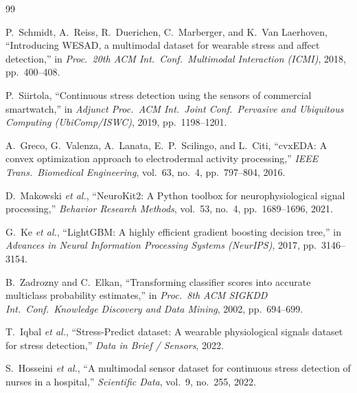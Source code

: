 \documentclass[11pt,a4paper]{article}
\begin{document}
\begin{thebibliography}{99}
\footnotesize

P.~Schmidt, A.~Reiss, R.~Duerichen, C.~Marberger, and K.~Van Laerhoven,
``Introducing WESAD, a multimodal dataset for wearable stress and affect detection,''
in \emph{Proc.\ 20th ACM Int.\ Conf.\ Multimodal Interaction (ICMI)}, 2018, pp.\ 400--408.

P.~Siirtola,
``Continuous stress detection using the sensors of commercial smartwatch,''
in \emph{Adjunct Proc.\ ACM Int.\ Joint Conf.\ Pervasive and Ubiquitous Computing (UbiComp/ISWC)},
2019, pp.\ 1198--1201.

A.~Greco, G.~Valenza, A.~Lanata, E.~P.~Scilingo, and L.~Citi,
``cvxEDA: A convex optimization approach to electrodermal activity processing,''
\emph{IEEE Trans.\ Biomedical Engineering}, vol.\ 63, no.\ 4, pp.\ 797--804, 2016.

D.~Makowski \emph{et al.},
``NeuroKit2: A Python toolbox for neurophysiological signal processing,''
\emph{Behavior Research Methods}, vol.\ 53, no.\ 4, pp.\ 1689--1696, 2021.

G.~Ke \emph{et al.},
``LightGBM: A highly efficient gradient boosting decision tree,''
in \emph{Advances in Neural Information Processing Systems (NeurIPS)}, 2017, pp.\ 3146--3154.

B.~Zadrozny and C.~Elkan,
``Transforming classifier scores into accurate multiclass probability estimates,''
in \emph{Proc.\ 8th ACM SIGKDD Int.\ Conf.\ Knowledge Discovery and Data Mining}, 2002,
pp.\ 694--699.

T.~Iqbal \emph{et al.},
``Stress-Predict dataset: A wearable physiological signals dataset for stress detection,''
\emph{Data in Brief / Sensors}, 2022.

S.~Hosseini \emph{et al.},
``A multimodal sensor dataset for continuous stress detection of nurses in a hospital,''
\emph{Scientific Data}, vol.\ 9, no.\ 255, 2022.

\end{thebibliography}
\end{document}
